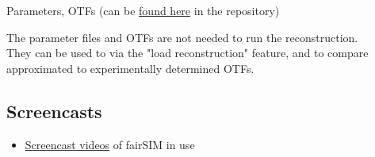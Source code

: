 \documentclass[twoside=false,
           a4paper,
           10pt,DIV=16,parindent=none,parskip=half]{article}
\begin{document}

Parameters, OTFs (can be
\href{https://github.com/fairSIM/test-datasets/tree/master/parameters}
{found here} in the repository)
\\
The parameter files and OTFs are not needed to run the reconstruction.\\
They can be used to via the "load reconstruction" feature, and to
compare approximated to experimentally determined OTFs.

\subsection*{Screencasts}

\begin{itemize}
\item
\href{./screencasts/}
{Screencast videos} of fairSIM in use
\end{itemize}
\end{document}
